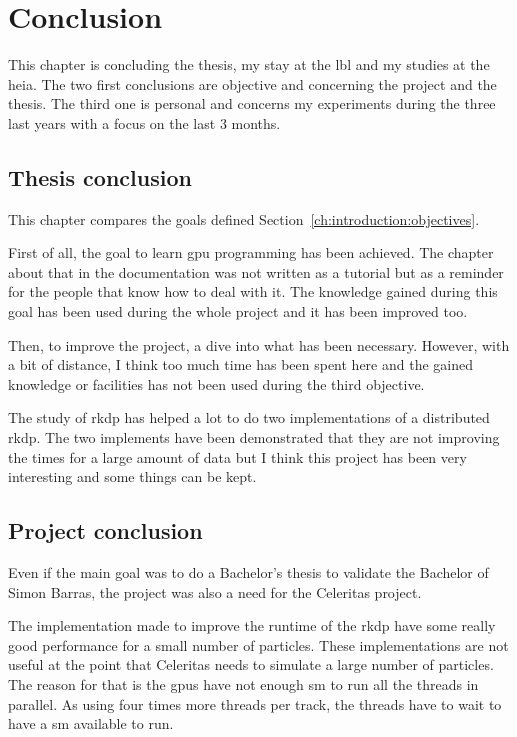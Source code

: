 \chapter{Conclusion}
\label{ch:conclusion}

This chapter is concluding the thesis, my stay at the \acrshort{lbl} and my
studies at the \acrshort{heia}.
The two first conclusions are objective and concerning the project and the thesis.
The third one is personal and concerns my experiments during the three last
years with a focus on the last 3 months.


\section{Thesis conclusion}
\label{ch:conclusion:thesis}

This chapter compares the goals defined Section~\ref{ch:introduction:objectives}.

First of all, the goal to learn \acrshort{gpu} programming has been achieved.
The chapter about that in the documentation was not written as a tutorial but
as a reminder for the people that know how to deal with it.
The knowledge gained during this goal has been used during the whole project
and it has been improved too.

Then, to improve the project, a dive into what has been necessary.
However, with a bit of distance, I think too much time has been spent here and
the gained knowledge or facilities has not been used during the third objective.

The study of \acrshort{rkdp} has helped a lot to do two implementations of a
distributed \acrshort{rkdp}.
The two implements have been demonstrated that they are not improving the times for
a large amount of data but I think this project has been very interesting and
some things can be kept.

\section{Project conclusion}
\label{ch:conclusion:project}

Even if the main goal was to do a Bachelor's thesis to validate the Bachelor of
Simon Barras, the project was also a need for the Celeritas project.

The implementation made to improve the runtime of the \acrshort{rkdp} have some
really good performance for a small number of particles.
These implementations are not useful at the point that Celeritas needs to simulate
a large number of particles.
The reason for that is the \acrshort{gpu}s have not enough \acrshort{sm} to run
all the threads in parallel.
As using four times more threads per track, the threads have to wait to have a
\acrshort{sm} available to run.

